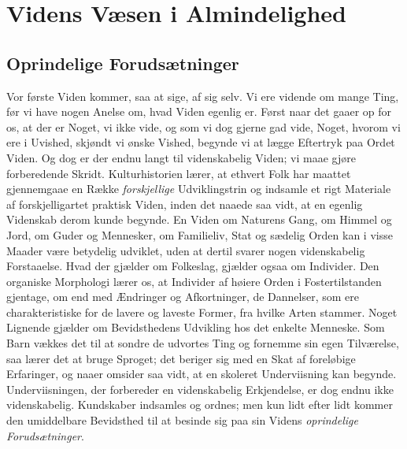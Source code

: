 \documentclass[12pt]{book}
\newcommand{\apage}[1]{\marginnote{\footnotesize\textit{[#1]}}}
\begin{document}
\chapter{Videns Væsen i Almindelighed}

\section{Oprindelige Forudsætninger}
\label{sec:1}
 \apage{1} 
\noindent

Vor første Viden kommer, saa at sige, af sig selv. Vi ere
vidende om mange Ting, før vi have nogen Anelse om, hvad Viden egenlig
er. Først naar det gaaer op for os, at der er Noget, vi ikke vide, og som
vi dog gjerne gad vide, Noget, hvorom vi ere i Uvished, skjøndt vi ønske
Vished, begynde vi at lægge Eftertryk paa Ordet Viden. Og dog er der
endnu langt til videnskabelig Viden; vi maae gjøre forberedende Skridt.
Kulturhistorien lærer, at ethvert Folk har maattet gjennemgaae en Række
\emph{forskjellige} Udviklingstrin og indsamle et rigt Materiale af
forskjelligartet praktisk Viden, inden det naaede saa vidt, at en egenlig
Videnskab derom kunde begynde. En Viden om Naturens Gang, om Himmel og
Jord, om Guder  \apage{2} og Mennesker, om Familieliv, Stat og sædelig Orden kan i
visse Maader være betydelig udviklet, uden at dertil svarer nogen
videnskabelig Forstaaelse. Hvad der gjælder om Folkeslag, gjælder ogsaa
om Individer. Den organiske Morphologi lærer os, at Individer af høiere
Orden i Fostertilstanden gjentage, om end med Ændringer og Afkortninger,
de Dannelser, som ere charakteristiske for de lavere og laveste Former,
fra hvilke Arten stammer. Noget Lignende gjælder om Bevidsthedens
Udvikling hos det enkelte Menneske. Som Barn vækkes det til at sondre de
udvortes Ting og fornemme sin egen Tilværelse, saa lærer det at bruge
Sproget; det beriger sig med en Skat af foreløbige Erfaringer, og naaer
omsider saa vidt, at en skoleret Underviisning kan begynde. Underviisningen,
der forbereder en videnskabelig Erkjendelse, er dog endnu ikke
videnskabelig. Kundskaber indsamles og ordnes; men kun lidt efter lidt
kommer den umiddelbare Bevidsthed til at besinde sig paa sin Videns
\emph{oprindelige Forudsætninger}.
\end{document}
